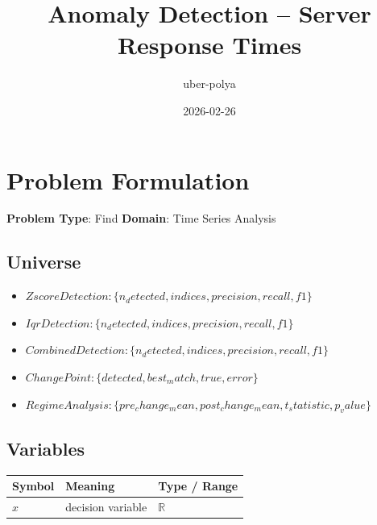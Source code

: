 \documentclass[11pt, a4paper]{article}
\title{Anomaly Detection -- Server Response Times}
\author{uber-polya}
\date{2026-02-26}
\begin{document}
\maketitle
\tableofcontents
\newpage

\section{Problem Formulation}

\begin{polyamodel}

\textbf{Problem Type}: Find \hfill
\textbf{Domain}: Time Series Analysis


\end{polyamodel}

\subsection{Universe}

\begin{itemize}
  \item $Zscore Detection: \{n_detected, indices, precision, recall, f1\}$
  \item $Iqr Detection: \{n_detected, indices, precision, recall, f1\}$
  \item $Combined Detection: \{n_detected, indices, precision, recall, f1\}$
  \item $Change Point: \{detected, best_match, true, error\}$
  \item $Regime Analysis: \{pre_change_mean, post_change_mean, t_statistic, p_value\}$
\end{itemize}

\subsection{Variables}

\begin{longtable}{lll}
\toprule
\textbf{Symbol} & \textbf{Meaning} & \textbf{Type / Range} \\
\midrule
\endhead
$x$ & decision variable & $\mathbb{{R}}$ \\
\bottomrule
\end{longtable}

\end{document}
